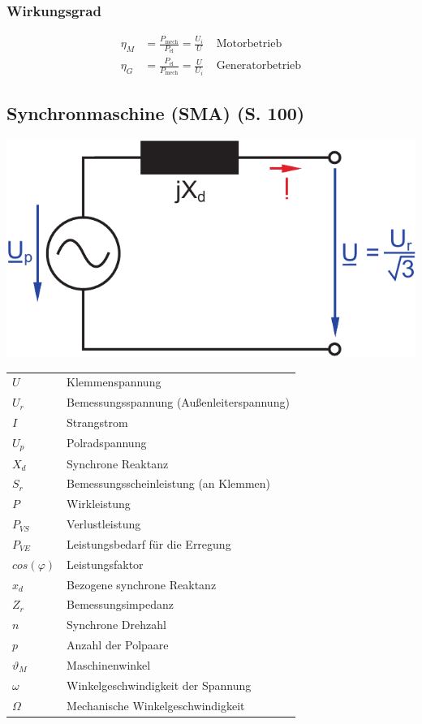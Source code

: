 \documentclass[a4paper,twocolumn,10pt]{article}
\begin{document}
\subsubsection{Wirkungsgrad}
\begin{equation*}
\begin{split}
\eta_M&=\frac{P_{\text{mech}}}{P_{\text{el}}}=\frac{U_i}{U}\;\;\;\;\text{Motorbetrieb}\\
\eta_G&=\frac{P_{\text{el}}}{P_{\text{mech}}}=\frac{U}{U_i}\;\;\;\;\text{Generatorbetrieb}
\end{split}
\end{equation*}

\newpage
\subsection{Synchronmaschine (SMA) (S. 100)}
\begin{center}
\includegraphics[width=0.7\columnwidth]{Grafiken/Synchronmaschine}
\end{center}
\begin{tabular}{ll}
$U$ & Klemmenspannung\\
$U_r$ & Bemessungsspannung (Außenleiterspannung)\\
$I$ & Strangstrom\\
$U_p$ & Polradspannung\\
$X_d$ & Synchrone Reaktanz\\
$S_r$ & Bemessungsscheinleistung (an Klemmen)\\
$P$ & Wirkleistung\\
$P_{VS}$ & Verlustleistung\\
$P_{VE}$ & Leistungsbedarf für die Erregung\\
$cos(\varphi)$ & Leistungsfaktor\\
$x_d$ & Bezogene synchrone Reaktanz\\
$Z_r$ & Bemessungsimpedanz\\
$n$ & Synchrone Drehzahl\\
$p$ & Anzahl der Polpaare\\
$\vartheta_M$ & Maschinenwinkel\\
$\omega$ & Winkelgeschwindigkeit der Spannung\\
$\Omega$ & Mechanische Winkelgeschwindigkeit
\end{tabular}
\end{document}
